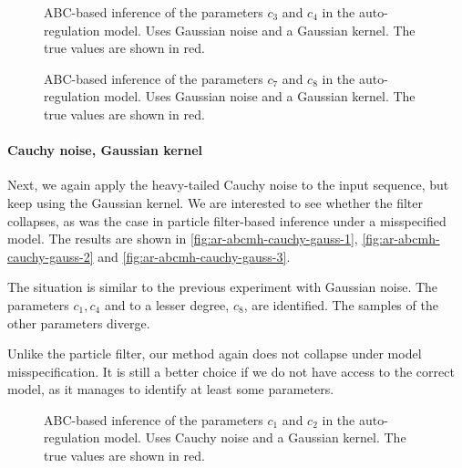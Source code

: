 \begin{figure}[htp]%
    \centering
    \qquad
    \caption{ABC-based inference of the parameters $c_3$ and $c_4$ in the auto-regulation model. Uses Gaussian noise and a Gaussian kernel. The true values are shown in red.}%
    \label{fig:ar-abcmh-gauss-gauss-2}%
\end{figure}

\begin{figure}[htp]%
    \centering
    \qquad
    \caption{ABC-based inference of the parameters $c_7$ and $c_8$ in the auto-regulation model. Uses Gaussian noise and a Gaussian kernel. The true values are shown in red.}%
    \label{fig:ar-abcmh-gauss-gauss-3}%
\end{figure}


\paragraph{Cauchy noise, Gaussian kernel}
Next, we again apply the heavy-tailed Cauchy noise to the input sequence, but keep using the Gaussian kernel. We are interested to see whether the filter collapses, as was the case in particle filter-based inference under a misspecified model. The results are shown in \autoref{fig:ar-abcmh-cauchy-gauss-1}, \autoref{fig:ar-abcmh-cauchy-gauss-2} and \autoref{fig:ar-abcmh-cauchy-gauss-3}.

The situation is similar to the previous experiment with Gaussian noise. The parameters $c_1, c_4$ and to a lesser degree, $c_8$, are identified. The samples of the other parameters diverge.

Unlike the particle filter, our method again does not collapse under model misspecification. It is still a better choice if we do not have access to the correct model, as it manages to identify at least some parameters.

\begin{figure}[htp]%
    \centering
    \qquad
    \caption{ABC-based inference of the parameters $c_1$ and $c_2$ in the auto-regulation model. Uses Cauchy noise and a Gaussian kernel. The true values are shown in red.}%
    \label{fig:ar-abcmh-cauchy-gauss-1}%
\end{figure}

